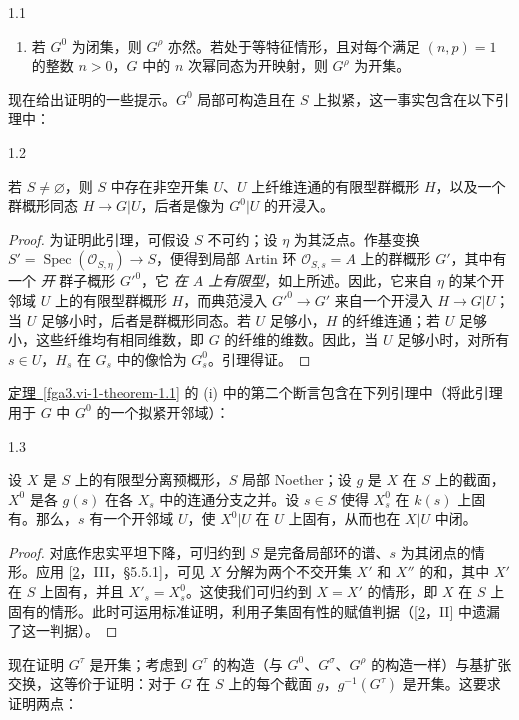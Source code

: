 \begin{theorem}{1.1}
\begin{enumerate}
      
 \item[iv.]若 \(G^0\) 为闭集，则 \(G^\rho \) 亦然。若处于等特征情形，且对每个满足 \((n,p)=1\) 的整数 \(n>0\)，\(G\) 中的 \(n\) 次幂同态为开映射，则 \(G^\rho \) 为开集。

    \end{enumerate}\end{theorem}\par{}现在给出证明的一些提示。\(G^0\) 局部可构造且在 \(S\) 上拟紧，这一事实包含在以下引理中：\begin{lemma}{1.2}\label{fga3.vi-1-lemma-1.2}\skipsinglepar\par{}若 \(S\neq \varnothing \)，则 \(S\) 中存在非空开集 \(U\)、\(U\) 上纤维连通的有限型群概形 \(H\)，以及一个群概形同态 \(H\to  G|U\)，后者是像为 \(G^0|U\) 的开浸入。\begin{proof}\par{}为证明此引理，可假设 \(S\) 不可约；设 \(\eta \) 为其泛点。作基变换 \(S'=\operatorname {Spec}(\mathcal {O}_{S,\eta })\to  S\)，便得到局部 Artin 环 \(\mathcal {O}_{S,s}=A\) 上的群概形 \(G'\)，其中有一个 \emph{开} 群子概形 \({G'}^0\)，它 \emph{在 \(A\) 上有限型}，如上所述。因此，它来自 \(\eta \) 的某个开邻域 \(U\) 上的有限型群概形 \(H\)，而典范浸入 \({G'}^0\to  G'\) 来自一个开浸入 \(H\to  G|U\)；当 \(U\) 足够小时，后者是群概形同态。若 \(U\) 足够小，\(H\) 的纤维连通；若 \(U\) 足够小，这些纤维均有相同维数，即 \(G\) 的纤维的维数。因此，当 \(U\) 足够小时，对所有 \(s\in  U\)，\(H_s\) 在 \(G_s\) 中的像恰为 \(G_s^0\)。引理得证。\end{proof}\end{lemma}\par{}\hyperref[fga3.vi-1-theorem-1.1]{定理~\ref*{fga3.vi-1-theorem-1.1}} 的 (i) 中的第二个断言包含在下列引理中（将此引理用于 \(G\) 中 \(G^0\) 的一个拟紧开邻域）：\begin{lemma}{1.3}\label{fga3.vi-1-lemma-1.3}\skipsinglepar\par{}设 \(X\) 是 \(S\) 上的有限型分离预概形，\(S\) 局部 Noether；设 \(g\) 是 \(X\) 在 \(S\) 上的截面，\(X^0\) 是各 \(g(s)\) 在各 \(X_s\) 中的连通分支之并。设 \(s\in  S\) 使得 \(X_s^0\) 在 \(k(s)\) 上固有。那么，\(s\) 有一个开邻域 \(U\)，使 \(X^0|U\) 在 \(U\) 上固有，从而也在 \(X|U\) 中闭。\begin{proof}\par{}对底作忠实平坦下降，可归约到 \(S\) 是完备局部环的谱、\(s\) 为其闭点的情形。应用 [\hyperref[GD1960]{2}，III，§5.5.1]，可见 \(X\) 分解为两个不交开集 \(X'\) 和 \(X''\) 的和，其中 \(X'\) 在 \(S\) 上固有，并且 \(X'_s=X_s^0\)。这使我们可归约到 \(X=X'\) 的情形，即 \(X\) 在 \(S\) 上固有的情形。此时可运用标准证明，利用子集固有性的赋值判据（[\hyperref[GD1960]{2}，II] 中遗漏了这一判据）。\end{proof}\end{lemma}\par{}现在证明 \(G^\tau \) 是开集；考虑到 \(G^\tau \) 的构造（与 \(G^0\)、\(G^\sigma \)、\(G^\rho \) 的构造一样）与基扩张交换，这等价于证明：对于 \(G\) 在 \(S\) 上的每个截面 \(g\)，\(g^{-1}(G^\tau )\) 是开集。这要求证明两点：\begin{enumerate}
    

\end{enumerate}
